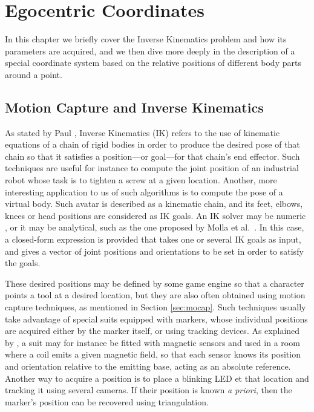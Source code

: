 
\chapter{Egocentric Coordinates}

\label{Chapter2}

In this chapter we briefly cover the Inverse Kinematics problem and how its parameters are acquired, and we then dive more deeply in the description of a special coordinate system based on the relative positions of different body parts around a point.

\section{Motion Capture and Inverse Kinematics}

As stated by Paul \cite{paul1981robot}, Inverse Kinematics (IK) refers to the use of kinematic equations of a chain of rigid bodies in order to produce the desired pose of that chain so that it satisfies a position---or goal---for that chain's end effector. Such techniques are useful for instance to compute the joint position of an industrial robot whose task is to tighten a screw at a given location. Another, more interesting application to us of such algorithms is to compute the pose of a virtual body. Such avatar is described as a kinematic chain, and its feet, elbows, knees or head positions are considered as IK goals. An IK solver may be numeric \cite{goldenberg1985complete,manocha1994efficient}, or it may be analytical, such as the one proposed by Molla et al.\ \cite{molla2013singularity}. In this case, a closed-form expression is provided that takes one or several IK goals as input, and gives a vector of joint positions and orientations to be set in order to satisfy the goals.

These desired positions may be defined by some game engine so that a character points a tool at a desired location, but they are also often obtained using motion capture techniques, as mentioned in Section \ref{sec:mocap}. Such techniques usually take advantage of special suits equipped with markers, whose individual positions are acquired either by the marker itself, or using tracking devices. As explained by \cite{west1995motion}, a suit may for instance be fitted with magnetic sensors and used in a room where a coil emits a given magnetic field, so that each sensor knows its position and orientation relative to the emitting base, acting as an absolute reference. Another way to acquire a position is to place a blinking LED et that location and tracking it using several cameras. If their position is known \textit{a priori}, then the marker's position can be recovered using triangulation.


